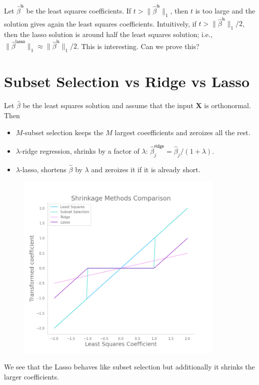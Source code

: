 \documentclass[11pt]{article}
\theoremstyle{definition}
\newcommand{\XX}{\mathbf{X}}
\newcommand{\ridge}{\textsf{ridge}}
\newcommand{\lasso}{\textsf{lasso}}
\newcommand{\ls}{\textsf{ls}}
\begin{document}
Let $\hat\beta^\ls$ be the least squares coefficients. If
$t>\|\hat\beta^\ls\|_1$, then $t$ is too large and the solution gives again the
least squares coefficients. Intuitively, if $t>\|\hat\beta^\ls\|_1/2$, then the
lasso solution is around half the least squares solution; i.e.,
$\|\hat\beta^\lasso\|_1 \approx \|\hat\beta^\ls\|_1/2$. This is interesting. Can
we prove this?

\section{Subset Selection vs Ridge vs Lasso}
Let $\hat\beta$ be the least squares solution and assume that the input $\XX$ is
orthonormal. Then
\begin{itemize}
	\item $M$-subset selection keeps the $M$ largest coeefficients and zeroizes
	      all the rest.
	\item $\lambda$-ridge regression, shrinks by a factor of $\lambda$:
	      $\hat\beta_j^\ridge= \hat\beta_j/(1+\lambda)$.
	\item $\lambda$-lasso, shortens $\hat\beta$ by
	      $\lambda$ and zeroizes it if it is already short.
\end{itemize}

\begin{figure}[h]
	\centering
	\includegraphics[width=10cm]{shrinkage-comparison.png}
\end{figure}
We see that the Lasso behaves like subset selection but additionally it shrinks
the larger coefficients.
\end{document}
